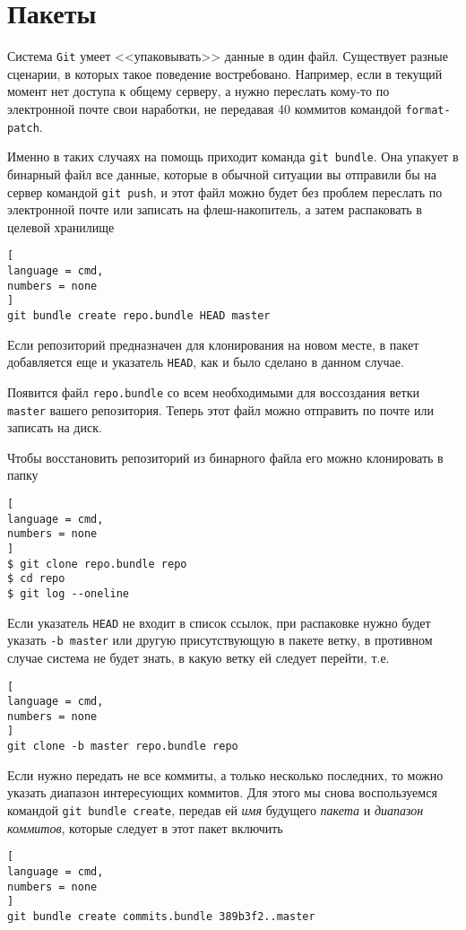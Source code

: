 \documentclass[%
	11pt,
	a4paper,
	utf8,
		]{article}
\begin{document}
\section{Пакеты}

Система \texttt{Git} умеет <<упаковывать>> данные в один файл. Существует разные сценарии, в которых такое поведение востребовано. Например, если в текущий момент нет доступа к общему серверу, а нужно переслать кому-то по электронной почте свои наработки, не передавая 40 коммитов командой \texttt{format-patch}.

Именно в таких случаях на помощь приходит команда \texttt{git bundle}. Она упакует в бинарный файл все данные, которые в обычной ситуации вы отправили бы на сервер командой \texttt{git push}, и этот файл можно будет без проблем переслать по электронной почте или записать на флеш-накопитель, а затем распаковать в целевой хранилище
\begin{lstlisting}[
language = cmd,
numbers = none
]
git bundle create repo.bundle HEAD master
\end{lstlisting}

Если репозиторий предназначен для клонирования на новом месте, в пакет добавляется еще и указатель \texttt{HEAD}, как и было сделано в данном случае.

Появится файл \texttt{repo.bundle} со всем необходимыми для воссоздания ветки \texttt{master} вашего репозитория. Теперь этот файл можно отправить по почте или записать на диск. 

Чтобы восстановить репозиторий из бинарного файла его можно клонировать в папку 
\begin{lstlisting}[
language = cmd,
numbers = none
]
$ git clone repo.bundle repo
$ cd repo
$ git log --oneline
\end{lstlisting}

Если указатель \texttt{HEAD} не входит в список ссылок, при распаковке нужно будет указать \verb|-b master| или другую присутствующую в пакете ветку, в противном случае система не будет знать, в какую ветку ей следует перейти, т.е.
\begin{lstlisting}[
language = cmd,
numbers = none
]
git clone -b master repo.bundle repo
\end{lstlisting}

Если нужно передать не все коммиты, а только несколько последних, то можно указать диапазон интересующих коммитов. Для этого мы снова воспользуемся командой \texttt{git bundle create}, передав ей \emph{имя} будущего \emph{пакета} и \emph{диапазон коммитов}, которые следует в этот пакет включить
\begin{lstlisting}[
language = cmd,
numbers = none
]
git bundle create commits.bundle 389b3f2..master
\end{lstlisting}
\end{document}

